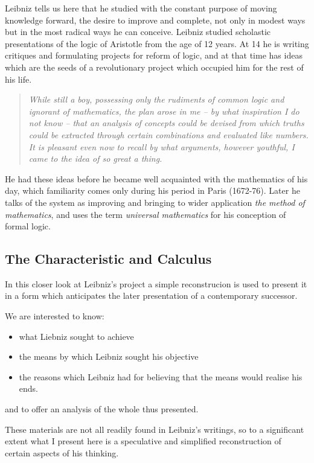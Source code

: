 Leibniz tells us here that he studied with the constant purpose of moving knowledge forward, the desire to improve and complete, not only in modest ways but in the most radical ways he can conceive.
Leibniz studied scholastic presentations of the logic of Aristotle from the age of 12 years.
At 14 he is writing critiques and formulating projects for reform of logic, and at that time has ideas which are the seeds of a revolutionary project which occupied him for the rest of his life.

\begin{quotation}
  {\it
    While still a boy, possessing only the
  rudiments of common logic and ignorant of mathematics, the plan arose in me -- by what inspiration I do not know -- that an analysis of concepts could be devised from which truths could be extracted through certain combinations and evaluated like numbers.
  It is pleasant even now to recall by what arguments, however youthful, I came to the idea of so great a thing.
  }%
\end{quotation}

He had these ideas before he became well acquainted with the mathematics of his day, which familiarity comes only during his period in Paris (1672-76).
Later he talks of the system as improving and bringing to wider application \emph{the method of mathematics}, and uses the term \emph{universal mathematics} for his conception of formal logic.

\subsection{The Characteristic and Calculus}

In this closer look at Leibniz's project a simple reconstrucion is used to present it in a form which anticipates the later presentation of a contemporary successor.

We are interested to know:

\begin{itemize}
\item what Liebniz sought to achieve
\item the means by which Leibniz sought his objective
\item the reasons which Leibniz had for believing that the means would realise his ends.
\end{itemize}

and to offer an analysis of the whole thus presented.

These materials are not all readily found in Leibniz's writings, so to a significant extent what I present here is a speculative and simplified reconstruction of certain aspects of his thinking.

